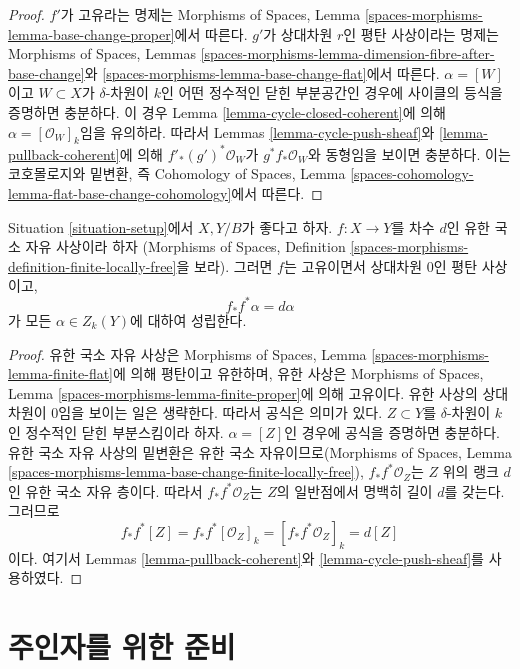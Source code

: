 \begin{proof}
$f'$가 고유라는 명제는 Morphisms of Spaces, Lemma
\ref{spaces-morphisms-lemma-base-change-proper}에서 따른다.
$g'$가 상대차원 $r$인 평탄 사상이라는 명제는 Morphisms of Spaces,
Lemmas
\ref{spaces-morphisms-lemma-dimension-fibre-after-base-change}와
\ref{spaces-morphisms-lemma-base-change-flat}에서 따른다.
$\alpha = [W]$이고 $W \subset X$가 $\delta$-차원이 $k$인 어떤
정수적인 닫힌 부분공간인 경우에 사이클의 등식을 증명하면 충분하다.
이 경우 Lemma \ref{lemma-cycle-closed-coherent}에 의해
$\alpha = [\mathcal{O}_W]_k$임을 유의하라. 따라서 Lemmas
\ref{lemma-cycle-push-sheaf}와 \ref{lemma-pullback-coherent}에 의해
$f'_*(g')^*\mathcal{O}_W$가 $g^*f_*\mathcal{O}_W$와 동형임을
보이면 충분하다. 이는 코호몰로지와 밑변환, 즉 Cohomology of Spaces,
Lemma \ref{spaces-cohomology-lemma-flat-base-change-cohomology}에서 따른다.
\end{proof}

\begin{lemma}
\label{lemma-finite-flat}
Situation \ref{situation-setup}에서 $X, Y/B$가 좋다고 하자.
$f : X \to Y$를 차수 $d$인 유한 국소 자유 사상이라 하자
(Morphisms of Spaces, Definition
\ref{spaces-morphisms-definition-finite-locally-free}을 보라).
그러면 $f$는 고유이면서 상대차원 $0$인 평탄 사상이고,
$$
f_*f^*\alpha = d\alpha
$$
가 모든 $\alpha \in Z_k(Y)$에 대하여 성립한다.
\end{lemma}

\begin{proof}
유한 국소 자유 사상은 Morphisms of Spaces, Lemma
\ref{spaces-morphisms-lemma-finite-flat}에 의해 평탄이고 유한하며,
유한 사상은 Morphisms of Spaces, Lemma
\ref{spaces-morphisms-lemma-finite-proper}에 의해 고유이다.
유한 사상의 상대차원이 $0$임을 보이는 일은 생략한다. 따라서 공식은
의미가 있다. $Z \subset Y$를 $\delta$-차원이 $k$인 정수적인 닫힌
부분스킴이라 하자.
$\alpha = [Z]$인 경우에 공식을 증명하면 충분하다. 유한 국소 자유
사상의 밑변환은 유한 국소 자유이므로(Morphisms of Spaces, Lemma
\ref{spaces-morphisms-lemma-base-change-finite-locally-free}),
$f_*f^*\mathcal{O}_Z$는 $Z$ 위의 랭크 $d$인 유한 국소 자유 층이다.
따라서 $f_*f^*\mathcal{O}_Z$는 $Z$의 일반점에서 명백히 길이 $d$를
갖는다. 그러므로
$$
f_*f^*[Z] = f_*f^*[\mathcal{O}_Z]_k =
[f_*f^*\mathcal{O}_Z]_k = d[Z]
$$
이다. 여기서 Lemmas \ref{lemma-pullback-coherent}와
\ref{lemma-cycle-push-sheaf}를 사용하였다.
\end{proof}

\section{주인자를 위한 준비}
\label{section-preparation-principal-divisors}


